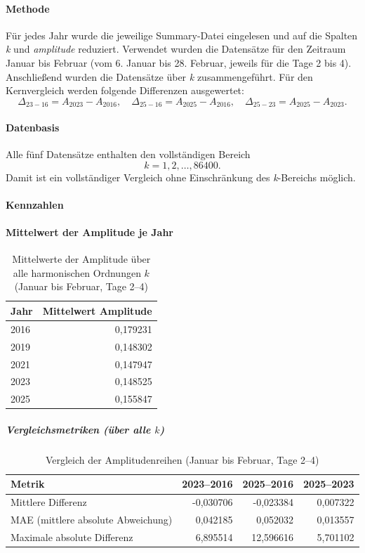 \documentclass[12pt,oneside]{article}
\begin{document}
\paragraph{Methode}
Für jedes Jahr wurde die jeweilige Summary-Datei eingelesen und auf die Spalten \textit{k} und
\textit{amplitude} reduziert. Verwendet wurden die Datensätze für den Zeitraum Januar bis Februar
(vom 6. Januar bis 28. Februar, jeweils für die Tage 2 bis 4). Anschließend wurden die Datensätze über \textit{k} zusammengeführt.
Für den Kernvergleich werden folgende Differenzen ausgewertet:
\[
\Delta_{23-16} = A_{2023} - A_{2016}, \quad
\Delta_{25-16} = A_{2025} - A_{2016}, \quad
\Delta_{25-23} = A_{2025} - A_{2023}.
\]

\paragraph{Datenbasis}
Alle fünf Datensätze enthalten den vollständigen Bereich
\[
k = 1,2,\dots,86400.
\]
Damit ist ein vollständiger Vergleich ohne Einschränkung des \textit{k}-Bereichs möglich.

\paragraph{Kennzahlen}

\paragraph{Mittelwert der Amplitude je Jahr}
\begin{table}[H]
\centering
\begin{tabular}{lr}
\toprule
Jahr & Mittelwert Amplitude \\
\midrule
2016 & 0,179231 \\
2019 & 0,148302 \\
2021 & 0,147947 \\
2023 & 0,148525 \\
2025 & 0,155847 \\
\bottomrule
\end{tabular}
\caption{Mittelwerte der Amplitude über alle harmonischen Ordnungen $k$ (Januar bis Februar, Tage 2--4)}
\end{table}

\subparagraph{Vergleichsmetriken (über alle $k$)}
\begin{table}[H]
\centering
\begin{tabular}{lrrr}
\toprule
Metrik & 2023--2016 & 2025--2016 & 2025--2023 \\
\midrule
Mittlere Differenz & -0,030706 & -0,023384 & 0,007322 \\
MAE (mittlere absolute Abweichung) & 0,042185 & 0,052032 & 0,013557 \\
Maximale absolute Differenz & 6,895514 & 12,596616 & 5,701102 \\
\bottomrule
\end{tabular}
\caption{Vergleich der Amplitudenreihen (Januar bis Februar, Tage 2--4)}
\end{table}
\end{document}
